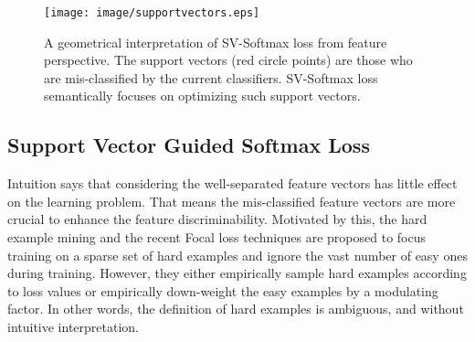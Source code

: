 \documentclass[10pt,twocolumn,letterpaper]{article}
\begin{document}
\begin{figure}[t]
\begin{center}
\texttt{[image: image/supportvectors.eps]}
\end{center}
   \caption{A geometrical interpretation of SV-Softmax loss from feature perspective. The support vectors (red circle points) are those who are mis-classified by the current classifiers. SV-Softmax loss semantically focuses on optimizing such support vectors.}
\label{fig:sv-softmax}
\end{figure}

\subsection{Support Vector Guided Softmax Loss}
Intuition says that considering the well-separated feature vectors has little effect on the learning problem. That means the mis-classified feature vectors are more crucial to enhance the feature discriminability. Motivated by this, the hard example mining \cite{OHEM} and the recent Focal loss \cite{Focal} techniques are proposed to focus training on a sparse set of hard examples and ignore the vast number of easy ones during training. However, they either empirically sample hard examples according to loss values or empirically down-weight the easy examples by a modulating factor. In other words, the definition of hard examples is ambiguous, and without intuitive interpretation.
\end{document}
